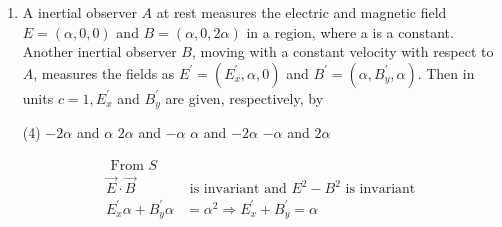 \begin{enumerate}
 \begin{tasks}(4)
	\task[\textbf{a.}]$3 \sqrt{\frac{\alpha}{\beta}}$
	\task[\textbf{b.}]$\sqrt{\frac{\alpha}{\beta}}$
	\task[\textbf{c.}]$\frac{1}{2} \sqrt{\frac{\alpha}{\beta}}$
	\task[\textbf{d.}] $\frac{1}{3} \sqrt{\frac{\alpha}{\beta}}$
\end{tasks}
\begin{answer}
	\begin{align*}
	\omega^{2}&=\alpha k+\beta k^{3}\\
	2 \omega \frac{d \omega}{d k}&=\alpha+3 \beta k^{2} \Rightarrow \frac{d \omega}{d k}=\frac{\alpha+3 \beta k^{2}}{2 \omega}\\
\text{	also }\omega \cdot \frac{\omega}{k}&=\alpha+\beta k^{2}\\
\text { divide (1) and (2) }&\\
\frac{d \omega / d k}{\omega(\omega / k)}&=\frac{\alpha+3 \beta k^{2}}{2 \omega} \times \frac{1}{\alpha+\beta k^{2}} \\
\because \frac{d \omega}{d k}&=\frac{\omega}{k}\\
\Rightarrow 2 \alpha+2 \beta k^{2}&=\alpha+3 \beta k^{2} \Rightarrow \alpha=\beta k^{2} \Rightarrow k=\sqrt{\frac{\alpha}{\beta}}
	\end{align*}
		So the correct answer is \textbf{Option (b)}
\end{answer}
\item  A inertial observer $A$ at rest measures the electric and magnetic field $E=(\alpha, 0,0)$ and $B=(\alpha, 0,2 \alpha)$ in a region, where a is a constant. Another inertial observer $B$, moving with a constant velocity with respect to $A$, measures the fields as $E^{\prime}=\left(E_{x}^{\prime}, \alpha, 0\right)$ and $B^{\prime}=\left(\alpha, B_{y}^{\prime}, \alpha\right)$. Then in units $c=1, E_{x}^{\prime}$ and $B_{y}^{\prime}$ are given, respectively, by
 \begin{tasks}(4)
	\task[\textbf{a.}]$-2 \alpha$ and $\alpha$
	\task[\textbf{b.}] $2 \alpha$ and $-\alpha$
	\task[\textbf{c.}] $\alpha$ and $-2 \alpha$
	\task[\textbf{d.}] $-\alpha$ and $2 \alpha$
\end{tasks}
\begin{answer}
	\begin{align*}
	\text { From } S&\\
	\vec{E} \cdot \vec{B} &\text { is invariant and } E^{2}-B^{2} \text { is invariant }\\
	E_{x}^{\prime} \alpha+B_{y}^{\prime} \alpha&=\alpha^{2} \Rightarrow E_{x}^{\prime}+B_{y}^{\prime}=\alpha \\

\end{align*}
\end{answer}
\end{enumerate}
